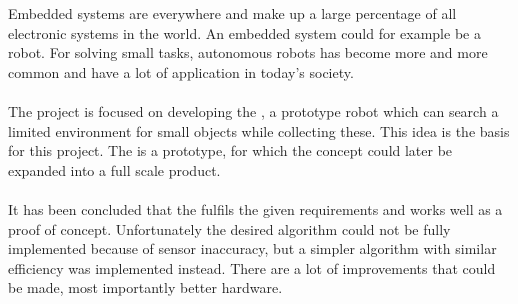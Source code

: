 Embedded systems are everywhere and make up a large percentage of all electronic systems in the world. An embedded system could for example be a robot. For solving small tasks, autonomous robots has become more and more common and have a lot of application in today's society.
\\\\
The project is focused on developing the \projname{}, a prototype robot which can search a limited environment for small objects while collecting these. This idea is the basis for this project. The \projname{} is a prototype, for which the concept could later be expanded into a full scale product.
\\\\
It has been concluded that the \projname{} fulfils the given requirements and works well as a proof of concept. Unfortunately the desired algorithm could not be fully implemented because of sensor inaccuracy, but a simpler algorithm with similar efficiency was implemented instead. There are a lot of improvements that could be made, most importantly better hardware.